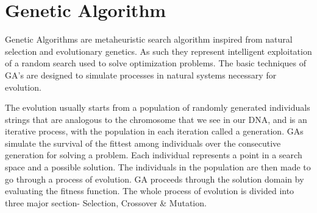 \section{\label{section:Genetic Algorithm}Genetic Algorithm}
Genetic Algorithms are metaheuristic search algorithm inspired from natural selection and evolutionary genetics. As such they represent intelligent exploitation of a random search used to solve optimization problems. The basic techniques of GA’s are designed to simulate processes in natural systems necessary for evolution.\par
The evolution usually starts from a population of randomly generated individuals strings that are analogous to the chromosome that we see in our DNA, and is an iterative process, with the population in each iteration called a generation. GAs simulate the survival of the fittest among individuals over the consecutive generation for solving a problem. Each individual represents a point in a search space and a possible solution. The individuals in the population are then made to go through a process of evolution. GA proceeds through the solution domain by evaluating the fitness function. 
The whole process of evolution is divided into three major section- Selection, Crossover \& Mutation.
